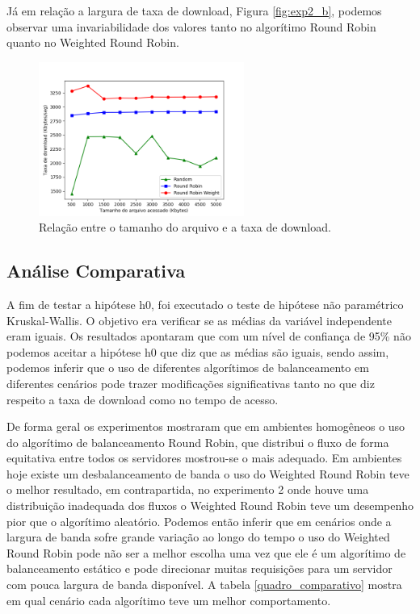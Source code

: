 \documentclass[12pt]{article}
\begin{document}
Já em relação a largura de taxa de download, Figura \ref{fig:exp2_b}, podemos observar uma invariabilidade dos valores tanto no algorítimo Round Robin quanto no Weighted Round Robin. 

\begin{figure}[ht]
\centering
\includegraphics[width=0.6\textwidth]{images/exp3_banda.png}
\caption{Relação entre o tamanho do arquivo e a taxa de download.}
\label{fig:exp3_b}
\end{figure}

\subsection{Análise Comparativa}

A fim de testar a hipótese h0, foi executado o teste de hipótese não paramétrico  Kruskal-Wallis. O objetivo era verificar se as médias da variável independente eram iguais. Os resultados apontaram que com um nível de confiança de 95\% não podemos aceitar a hipótese h0 que diz que as médias são iguais, sendo assim, podemos inferir que o uso de diferentes algorítimos de balanceamento em diferentes cenários pode trazer modificações significativas tanto no que diz respeito a taxa de download como no tempo de acesso.

De forma geral os experimentos mostraram que em ambientes homogêneos o uso do algorítimo de balanceamento Round Robin, que distribui o fluxo de forma equitativa entre todos os servidores mostrou-se o mais adequado. Em ambientes hoje existe um desbalanceamento de banda o uso do Weighted Round Robin teve o melhor resultado, em contrapartida, no experimento 2 onde houve uma distribuição inadequada dos fluxos o Weighted Round Robin teve um desempenho pior que o algorítimo aleatório. Podemos então inferir que em cenários onde a largura de banda sofre grande variação ao longo do tempo o uso do Weighted Round Robin pode não ser a melhor escolha uma vez que ele é um algorítimo de balanceamento estático e pode direcionar muitas requisições para um servidor com pouca largura de banda disponível. A tabela \ref{quadro_comparativo} mostra em qual cenário cada algorítimo teve um melhor comportamento.
\end{document}
